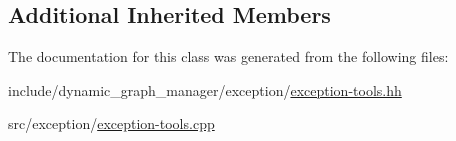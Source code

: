 \subsection*{Additional Inherited Members}


The documentation for this class was generated from the following files\+:\begin{DoxyCompactItemize}
\item 
include/dynamic\+\_\+graph\+\_\+manager/exception/\hyperlink{exception-tools_8hh}{exception-\/tools.\+hh}\item 
src/exception/\hyperlink{exception-tools_8cpp}{exception-\/tools.\+cpp}\end{DoxyCompactItemize}
